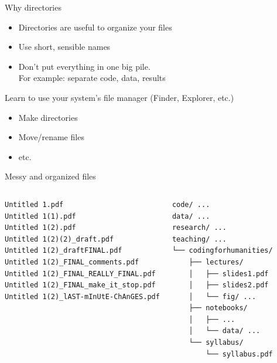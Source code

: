 \documentclass[aspectratio=169,usenames,dvipsnames]{beamer}
\begin{document}
\begin{frame}{Why directories}
    \begin{itemize}
        \item Directories are useful to organize your files
        \item Use short, sensible names
        \item Don't put everything in one big pile. \\
            For example: separate code, data, results
    \end{itemize}
    \pause 
    Learn to use your system's file manager (Finder, Explorer, etc.)
    \begin{itemize}
        \item Make directories
        \item Move/rename files
        \item etc.
    \end{itemize}
    
\end{frame}

\begin{frame}[fragile]{Messy and organized files}
\begin{columns}
\begin{verbatim}
Untitled 1.pdf
Untitled 1(1).pdf
Untitled 1(2).pdf
Untitled 1(2)(2)_draft.pdf
Untitled 1(2)_draftFINAL.pdf
Untitled 1(2)_FINAL_comments.pdf
Untitled 1(2)_FINAL_REALLY_FINAL.pdf
Untitled 1(2)_FINAL_make_it_stop.pdf
Untitled 1(2)_lAST-mInUtE-ChAnGES.pdf
\end{verbatim}
\pause
{}
\begin{verbatim}
code/ ...
data/ ...
research/ ...
teaching/ ...
└── codingforhumanities/
    ├── lectures/
    │   ├── slides1.pdf
    │   ├── slides2.pdf
    │   └── fig/ ...
    ├── notebooks/
    │   ├── ...
    │   └── data/ ...
    └── syllabus/
        └── syllabus.pdf
\end{verbatim}
\end{columns}
\end{frame}
\end{document}
